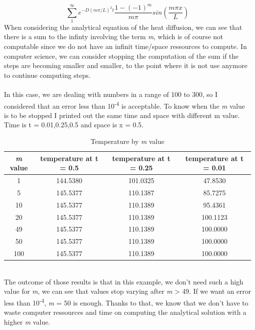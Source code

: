 \documentclass[12pt, a4paper]{report}
\begin{document}
\paragraph{}
\begin{equation}
\sum_{1}^{\infty}e^{-D(m\pi/L)^{2}t}\frac{1-(-1)^{m}}{m\pi}sin(\frac{m\pi x}{L})
\end{equation}
When considering the analytical equation of the heat diffusion, we can see that there is a sum to the infinty involving the term \textit{m}, which is of course not computable since we do not have an infinit time/space ressources to compute. In computer science, we can consider stopping the computation of the sum if the steps are becoming smaller and smaller, to the point where it is not use anymore to continue computing steps.
\paragraph{}
In this case, we are dealing with numbers in a range of 100 to 300, so I considered that an error less than 10\textsuperscript{-4} is acceptable. To know when the \textit{m} value is to be stopped I printed out the same time and space with different m value. Time is t = 0.01,0.25,0.5 and space is x = 0.5.
\begin{table}[ht]
\centering
\begin{tabular}{c c c c}
\toprule
\textit{m} value & temperature at t = 0.5 & temperature at t = 0.25 & temperature at t = 0.01 \\
\midrule
1 &144.5380&101.0325&47.8530\\
5 &145.5377&110.1387&85.7275\\
10 &145.5377&110.1389&95.4361\\
20 &145.5377&110.1389&100.1123\\
49 &145.5377&110.1389&100.0000\\
50 &145.5377&110.1389&100.0000\\
100 &145.5377&110.1389&100.0000\\
\end{tabular}
\caption{Temperature by \textit{m} value}
\end{table}\\
The outcome of those results is that in this example, we don't need such a high value for \textit{m}, we can see that values stop varying after \textit{m} > 49. If we want an error less than 10\textsuperscript{-4}, \textit{m} = 50 is enough. Thanks to that, we know that we don't have to waste computer ressources and time on computing the analytical solution with a higher \textit{m} value.
\end{document}
